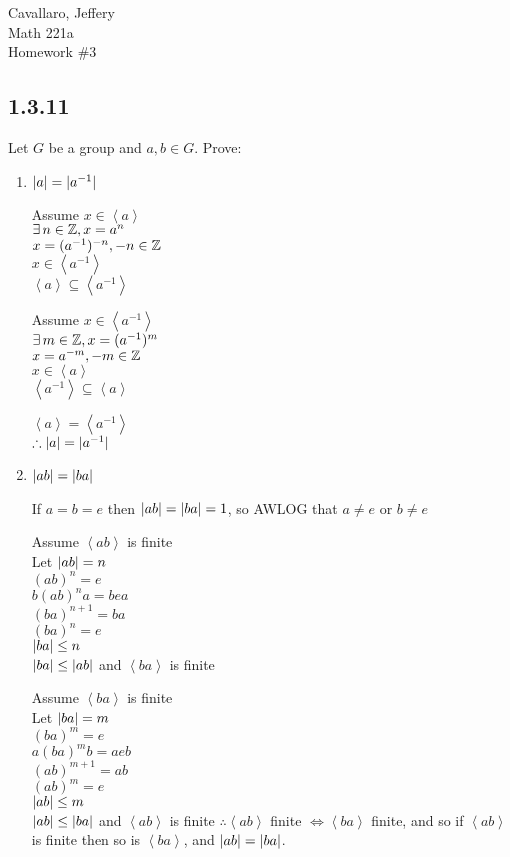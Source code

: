 \documentclass[letterpaper,12pt,fleqn]{article}
\newcommand{\cycle}[1]{\left<#1\right>}
\begin{document}
Cavallaro, Jeffery \\
Math 221a \\
Homework \#3

\bigskip

\subsection*{1.3.11}

Let $G$ be a group and $a,b\in G$. Prove:

\begin{enumerate}
\item $\lvert a\rvert=\lvert a^{-1}\rvert$

  Assume $x\in\cycle{a}$ \\
  $\exists\,n\in\mathbb{Z},x=a^n$ \\
  $x=(a^{-1})^{-n},-n\in\mathbb{Z}$ \\
  $x\in\cycle{a^{-1}}$ \\
  $\cycle{a}\subseteq\cycle{a^{-1}}$

  Assume $x\in\cycle{a^{-1}}$ \\
  $\exists\,m\in\mathbb{Z},x=(a^{-1})^m$ \\
  $x=a^{-m},-m\in\mathbb{Z}$ \\
  $x\in\cycle{a}$ \\
  $\cycle{a^{-1}}\subseteq\cycle{a}$

  $\cycle{a}=\cycle{a^{-1}}$ \\
  $\therefore\lvert a\rvert=\lvert a^{-1}\rvert$

  \bigskip

\item $\lvert ab\rvert=\lvert ba\rvert$

  If $a=b=e$ then $\lvert ab\rvert=\lvert ba\rvert=1$, so AWLOG that $a\ne e$ or $b\ne e$

  Assume $\cycle{ab}$ is finite \\
  Let $\lvert ab\rvert=n$ \\
  $(ab)^n=e$ \\
  $b(ab)^na=bea$ \\
  $(ba)^{n+1}=ba$ \\
  $(ba)^n=e$ \\
  $\lvert ba\rvert\le n$ \\
  $\lvert ba\rvert\le\lvert ab\rvert$ and $\cycle{ba}$ is finite

  Assume $\cycle{ba}$ is finite \\
  Let $\lvert ba\rvert=m$ \\
  $(ba)^m=e$ \\
  $a(ba)^mb=aeb$ \\
  $(ab)^{m+1}=ab$ \\
  $(ab)^m=e$ \\
  $\lvert ab\rvert\le m$ \\
  $\lvert ab\rvert\le\lvert ba\rvert$ and $\cycle{ab}$ is finite
\newpage
  $\therefore\cycle{ab}$ finite $\iff\cycle{ba}$ finite, and so if $\cycle{ab}$
  is finite then so is $\cycle{ba}$, and $\lvert ab\rvert=\lvert ba\rvert$.


\end{enumerate}
\end{document}
